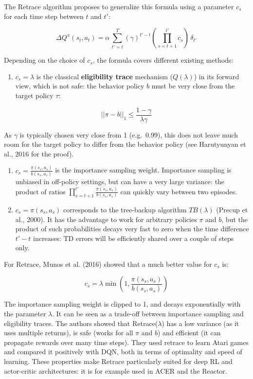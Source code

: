 \documentclass[
  letterpaper,
  DIV=11,
  numbers=noendperiod]{scrreprt}
\providecommand{\tightlist}{%
  \setlength{\itemsep}{0pt}\setlength{\parskip}{0pt}}\usepackage{longtable,booktabs,array}
\begin{document}
The Retrace algorithm proposes to generalize this formula using a
parameter \(c_s\) for each time step between \(t\) and \(t'\):

\[
    \Delta Q^\pi(s_t, a_t) = \alpha \, \sum_{t'=t}^T (\gamma)^{t'-t} \left(\prod_{s=t+1}^{t'} c_s \right) \, \delta_{t'}
\]

Depending on the choice of \(c_s\), the formula covers different
existing methods:

\begin{enumerate}
\def\labelenumi{\arabic{enumi}.}
\tightlist
\item
  \(c_s = \lambda\) is the classical \textbf{eligibility trace}
  mechanism (\(Q(\lambda)\)) in its forward view, which is not safe: the
  behavior policy \(b\) must be very close from the target policy
  \(\tau\):
\end{enumerate}

\[
    || \pi - b ||_1 \leq \frac{1 - \gamma}{\lambda \gamma}
\]

As \(\gamma\) is typically chosen very close from 1 (e.g.~0.99), this
does not leave much room for the target policy to differ from the
behavior policy (see Harutyunyan et al., 2016 for the proof).

\begin{enumerate}
\def\labelenumi{\arabic{enumi}.}
\setcounter{enumi}{1}
\item
  \(c_s = \frac{\pi(s_s, a_s)}{b(s_s, a_s)}\) is the importance sampling
  weight. Importance sampling is unbiased in off-policy settings, but
  can have a very large variance: the product of ratios
  \(\prod_{s=t+1}^{t'} \frac{\pi(s_s, a_s)}{b(s_s, a_s)}\) can quickly
  vary between two episodes.
\item
  \(c_s = \pi(s_s, a_s)\) corresponds to the tree-backup algorithm
  \(TB(\lambda)\) (Precup et al., 2000). It has the advantage to work
  for arbitrary policies \(\pi\) and \(b\), but the product of such
  probabilities decays very fast to zero when the time difference
  \(t' - t\) increases: TD errors will be efficiently shared over a
  couple of steps only.
\end{enumerate}

For Retrace, Munos et al. (2016) showed that a much better value for
\(c_s\) is:

\[
    c_s = \lambda \min (1, \frac{\pi(s_s, a_s)}{b(s_s, a_s)})
\]

The importance sampling weight is clipped to 1, and decays exponentially
with the parameter \(\lambda\). It can be seen as a trade-off between
importance sampling and eligibility traces. The authors showed that
Retrace(\(\lambda\)) has a low variance (as it uses multiple returns),
is safe (works for all \(\pi\) and \(b\)) and efficient (it can
propagate rewards over many time steps). They used retrace to learn
Atari games and compared it positively with DQN, both in terms of
optimality and speed of learning. These properties make Retrace
particularly suited for deep RL and actor-critic architectures: it is
for example used in ACER and the Reactor.
\end{document}
